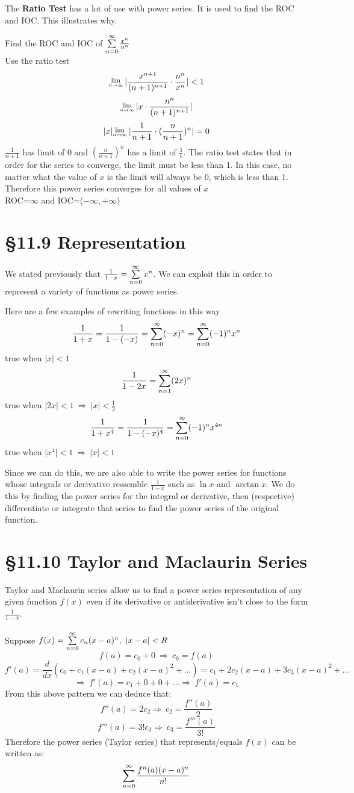 \documentclass[12 pt]{article}
\begin{document}
		The \textbf{Ratio Test} has a lot of use with power series. It is used to find the ROC and IOC. This illustrates why.
		\begin{exmp*}
			Find the ROC and IOC of $\sum\limits_{n=0}^{\infty} \frac{x^n}{n^n}$\\
			Use the ratio test\\
			$$\Lim{n\toinfty} \lvert\frac{x^{n+1}}{(n+1)^{n+1}}\cdot\frac{n^n}{x^n}\rvert<1$$
			$$\Lim{n\toinfty}\lvert x\cdot\frac{n^n}{(n+1)^{n+1}}\rvert$$
			$$\lvert x\rvert\Lim{n\toinfty}\lvert\frac{1}{n+1}\cdot(\frac{n}{n+1})^n\rvert=0$$
			$\frac{1}{n+1}$ has limit of 0 and $(\frac{n}{n+1})^n$ has a limit of $\frac{1}{e}$. The ratio test states that in order for the series to converge, the limit must be less than 1. In this case, no matter what the value of $x$ is the limit will always be 0, which is less than 1. Therefore this power series converges for all values of $x$\\
			ROC=$\infty$ and IOC=($-\infty, +\infty$)
		\end{exmp*}
	\section{\S 11.9 Representation}
		We stated previously that $\frac{1}{1-x}=\sum\limits_{n=0}^{\infty} x^n$. We can exploit this in order to represent a variety of functions as power series.
		\begin{exmp*}
			Here are a few examples of rewriting functions in this way
			$$\frac{1}{1+x}=\frac{1}{1-(-x)}=\sum\limits_{n=0}^{\infty} (-x)^n=\sum\limits_{n=0}^{\infty} (-1)^nx^n$$
			true when $\lvert x\rvert<1$
			$$\frac{1}{1-2x}=\sum\limits_{n=1}^{\infty} (2x)^n$$
			true when $\lvert 2x\rvert<1\ \Rightarrow \ \lvert x\rvert<\frac{1}{2}$
			$$\frac{1}{1+x^4}=\frac{1}{1-(-x)^4}=\sum\limits_{n=0}^{\infty} (-1)^nx^{4n}$$
			true when $\lvert x^4\rvert<1\ \Rightarrow \ \lvert x\rvert<1$
		\end{exmp*}
		Since we can do this, we are also able to write the power series for functions whose integrals or derivative ressemble $\frac{1}{1-x}$ such as $\ln{x}$ and $\arctan{x}$. We do this by finding the power series for the integral or derivative, then (respective) differentiate or integrate that series to find the power series of the original function.
	\section{\S 11.10 Taylor and Maclaurin Series}
		Taylor and Maclaurin series allow us to find a power series representation of any given function $f(x)$ even if its derivative or antiderivative isn't close to the form $\frac{1}{1-x}$.\\\\
		Suppose $f(x)=\sumz c_n(x-a)^n,\ \left|x-a\right|<R$
		$$f(a)=c_0+0\ \Rightarrow\ c_0=f(a)$$
		$$f'(a)=\frac{d}{dx}(c_0+c_1(x-a)+c_2(x-a)^2+...)=c_1+2c_2(x-a)+3c_3(x-a)^2+...$$
		$$\Rightarrow\ f'(a)=c_1+0+0+...\Rightarrow\ f'(a)=c_1$$
		From this above pattern we can deduce that:
		$$f''(a)=2c_2\Rightarrow\ c_2=\frac{f''(a)}{2}$$
		$$f'''(a)=3!c_3\Rightarrow\ c_3=\frac{f'''(a)}{3!}$$
		Therefore the power series (Taylor series) that represents/equals $f(x)$ can be written as:
		$$\sum\limits_{n=0}^{\infty} \frac{f^n(a)(x-a)^n}{n!}$$
\end{document}

